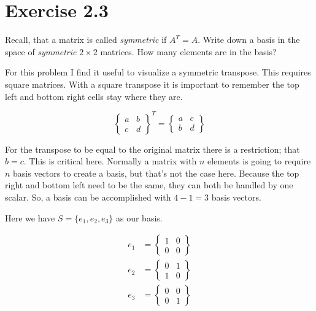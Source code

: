 \section*{Exercise 2.3}

Recall, that a matrix is called \emph{symmetric} if $A^T = A$. Write down a basis in the space of \emph{symmetric} $2 \times 2$ matrices. How many elements are in the basis?

For this problem I find it useful to visualize a symmetric transpose. This requires square matrices. With a square transpose it is important to remember the top left and bottom right cells stay where they are.  

\[
	\begin{Bmatrix}
		a & b \\
		c & d
	\end{Bmatrix}^T
= 
\begin{Bmatrix}
	a & c \\
	b & d
\end{Bmatrix}
\]

For the transpose to be equal to the original matrix there is a restriction; that $b = c$. This is critical here. Normally a matrix with $n$ elements is going to require $n$ basis vectors to create a basis, but that's not the case here. Because the top right and bottom left need to be the same, they can both be handled by one scalar. So, a basis can be accomplished with $4 - 1 = 3$ basis vectors.

Here we have $S = \{e_{1}, e_{2}, e_{3}\}$ as our basis.

\[
\begin{aligned}
e_{1} &= 
\begin{Bmatrix}
	1 & 0 \\
	0 & 0
\end{Bmatrix}
\\ 
e_{2} &= 
\begin{Bmatrix}
	0 & 1 \\
	1 & 0
\end{Bmatrix}
\\
e_{3} &= 
\begin{Bmatrix}
	0 & 0 \\
	0 & 1
\end{Bmatrix}
\end{aligned}
\]


